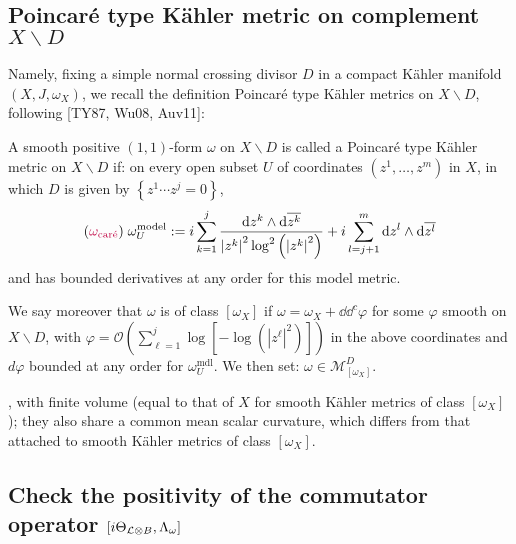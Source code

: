 \documentclass[lang=en,12pt]{beautybook}
\begin{document}
\subsection{Poincar\'e type
K\"ahler metric on complement \texorpdfstring{$X\backslash D$}{}}

Namely\cite[Introduction,Definition 2]{auvray2013note}, fixing a simple normal crossing divisor $D$ in a compact K\"ahler manifold $\left(X, J, \omega_X\right)$, we recall the definition Poincaré type Kähler metrics on $X \backslash D$, following [TY87, Wu08, Auv11]:

\begin{definition}
A smooth positive $(1,1)$-form $\omega$ on $X \backslash D$ is called a Poincaré type Kähler metric on $X \backslash D$ if: on every open subset $U$ of coordinates $\left(z^1, \ldots, z^m\right)$ in $X$, in which $D$ is given by $\left\{z^1 \cdots z^j=0\right\}$, 
\begin{equation*}
  ({\color{purple}\omega_{\text{car\'e}}})\;\omega_U^{\mathrm{model}}:=i\sum_{k=1}^{j}\frac{ \dd z^k \wedge \dd \overline{z^k}}{\left|z^k\right|^2 \log ^2\left(\left|z^k\right|^2\right)}+i\sum_{l=j+1}^{m} \dd z^{l} \wedge \dd \overline{z^{l}}   
\end{equation*}
and has bounded derivatives at any order for this model metric.

We say moreover that $\omega$ is of class $\left[\omega_X\right]$ if $\omega=\omega_X+\dd \dd^c \varphi$ for some $\varphi$ smooth on $X \backslash D$, with $\varphi=\mathcal{O}\left(\sum_{\ell=1}^j \log \left[-\log \left(\left|z^{\ell}\right|^2\right)\right]\right)$ in the above coordinates and $d \varphi$ bounded at any order for $\omega_U^{\mathrm{mdl}}$. We then set: $\omega \in \mathscr{M}_{\left[\omega_X\right]}^D$.
\end{definition}

\vspace{.3em}, with finite volume (equal to that of $X$ for smooth Kähler metrics of class $\left[\omega_X\right]$ ); they also share a common mean scalar curvature, which differs from that attached to smooth Kähler metrics of class $\left[\omega_X\right]$.

\subsection{Check the positivity of the commutator operator \texorpdfstring{$[i\Theta_{{\mathcal L}\otimes B},\Lambda_\omega]$}{}}
\end{document}
